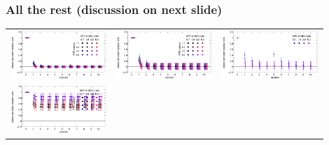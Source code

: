 \documentclass[compress]{beamer}
\begin{document}
\begin{frame}
\frametitle{All the rest (discussion on next slide)}
\begin{tabular}{p{0.3\linewidth} p{0.3\linewidth} p{0.3\linewidth}}
\includegraphics[width=\linewidth]{mb2_meanstdev.png} &
\includegraphics[width=\linewidth]{mb3_meanstdev.png} &
\includegraphics[width=\linewidth]{mb4_meanstdev.png} \\
\includegraphics[width=\linewidth]{me12_meanstdev.png} &

\end{tabular}
\end{frame}
\end{document}
